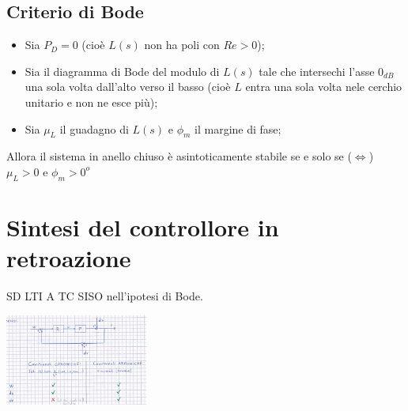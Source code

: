     \subsection{Criterio di Bode}
    \begin{itemize}
        \item Sia $P_D = 0$ (cioè $L(s)$ non ha poli con $Re > 0$);
        \item Sia il diagramma di Bode del modulo di $L(s)$ tale che intersechi l'asse $0_{dB}$ una sola volta dall'alto verso il basso (cioè $L$ entra una sola volta nele cerchio unitario e non ne esce più);
        \item Sia $\mu_L$ il guadagno di $L(s)$ e $\phi_m$ il margine di fase;
    \end{itemize}
    Allora il sistema in anello chiuso è asintoticamente stabile se e solo se ($\Leftrightarrow$) $\mu_L > 0$ e $\phi_m > 0^o$
    \newpage\section{Sintesi del controllore in retroazione}
    SD LTI A TC SISO nell'ipotesi di Bode.
    \begin{center}
        \includegraphics[height=3cm]{../formulario/img2.JPG}
    \end{center}
